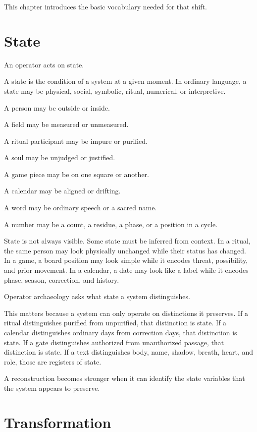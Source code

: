 \documentclass[11pt]{book}
\begin{document}
This chapter introduces the basic vocabulary needed for that shift.

\section{State}

An operator acts on state.

A state is the condition of a system at a given moment. In ordinary language, a state may be physical, social, symbolic, ritual, numerical, or interpretive.

A person may be outside or inside.

A field may be measured or unmeasured.

A ritual participant may be impure or purified.

A soul may be unjudged or justified.

A game piece may be on one square or another.

A calendar may be aligned or drifting.

A word may be ordinary speech or a sacred name.

A number may be a count, a residue, a phase, or a position in a cycle.

State is not always visible. Some state must be inferred from context. In a ritual, the same person may look physically unchanged while their status has changed. In a game, a board position may look simple while it encodes threat, possibility, and prior movement. In a calendar, a date may look like a label while it encodes phase, season, correction, and history.

Operator archaeology asks what state a system distinguishes.

This matters because a system can only operate on distinctions it preserves. If a ritual distinguishes purified from unpurified, that distinction is state. If a calendar distinguishes ordinary days from correction days, that distinction is state. If a gate distinguishes authorized from unauthorized passage, that distinction is state. If a text distinguishes body, name, shadow, breath, heart, and role, those are registers of state.

A reconstruction becomes stronger when it can identify the state variables that the system appears to preserve.

\section{Transformation}
\end{document}
